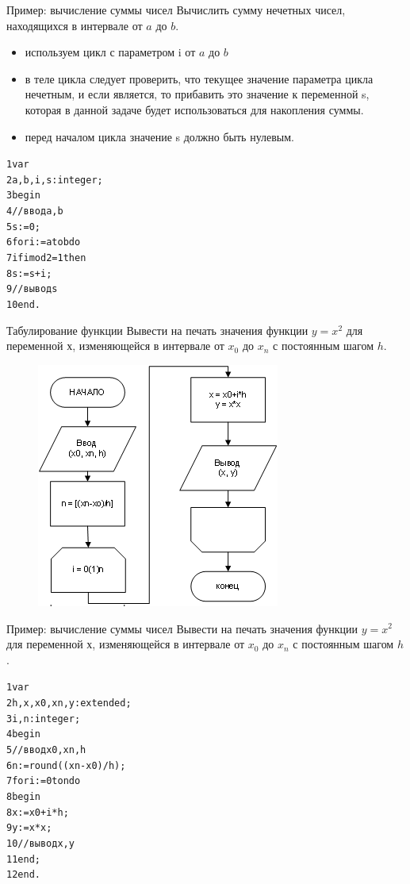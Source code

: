 \documentclass{beamer}
\begin{document}
\begin{frame}[fragile]{Пример: вычисление суммы чисел}
Вычислить сумму нечетных чисел, находящихся в интервале от $a$ до $b$. 
\begin{itemize}
\item используем цикл с параметром i от $a$ до $b$
\item в теле цикла следует проверить, что текущее значение параметра цикла нечетным, и если является, то прибавить это значение к переменной s, которая в данной задаче будет использоваться для накопления суммы. 
\item перед началом цикла значение s должно быть нулевым.
\end{itemize}
\begin{alltt}
1 var
2   a, b, i, s: integer;
3 begin
4   //ввод a, b
5   s := 0;
6   for i := a to b do
7     if i mod 2 = 1 then
8        s := s + i;
9   //вывод s
10 end.
\end{alltt}
\end{frame}

\begin{frame}{Табулирование функции}
Вывести на печать значения функции $y = x^2$ для переменной $х$, изменяющейся в интервале от $x_0$ до $x_n$ с постоянным шагом $h$.
\begin{figure}[h]
\centering
\includegraphics[scale=0.7]{images/lec04-pic07.png}
\end{figure}
\end{frame}

\begin{frame}[fragile]{Пример: вычисление суммы чисел}
Вывести на печать значения функции $y = x^2$ для переменной $х$, изменяющейся в интервале от $x_0$ до $x_n$ с постоянным шагом $h$.
\begin{alltt}
1 var
2   h, x, x0, xn, y: extended; 
3   i, n: integer;
4 begin
5   //ввод x0, xn, h
6   n := round((xn-x0)/h);
7   for i := 0 to n do
8   begin
8     x := x0 + i * h;
9     y := x * x;
10    //вывод x, y
11  end; 
12 end.
\end{alltt}
\end{frame}
\end{document}
